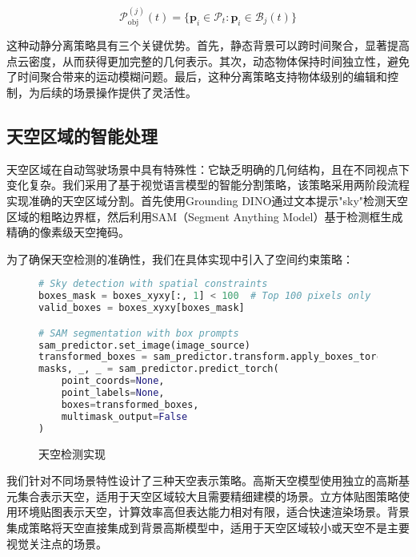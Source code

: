 \begin{equation}
\mathcal{P}_{\text{obj}}^{(j)}(t) = \{\mathbf{p}_i \in \mathcal{P}_t : \mathbf{p}_i \in \mathcal{B}_j(t)\}
\label{eq:object_points}
\end{equation}

这种动静分离策略具有三个关键优势。首先，静态背景可以跨时间聚合，显著提高点云密度，从而获得更加完整的几何表示。其次，动态物体保持时间独立性，避免了时间聚合带来的运动模糊问题。最后，这种分离策略支持物体级别的编辑和控制，为后续的场景操作提供了灵活性。

\subsection{天空区域的智能处理}

天空区域在自动驾驶场景中具有特殊性：它缺乏明确的几何结构，且在不同视点下变化复杂。我们采用了基于视觉语言模型的智能分割策略，该策略采用两阶段流程实现准确的天空区域分割。首先使用Grounding DINO通过文本提示"sky"检测天空区域的粗略边界框，然后利用SAM（Segment Anything Model）基于检测框生成精确的像素级天空掩码。

为了确保天空检测的准确性，我们在具体实现中引入了空间约束策略：

\begin{figure}[!b]
  \begin{tmpbox}
    \begin{lstlisting}[language=Python]
# Sky detection with spatial constraints
boxes_mask = boxes_xyxy[:, 1] < 100  # Top 100 pixels only
valid_boxes = boxes_xyxy[boxes_mask]

# SAM segmentation with box prompts
sam_predictor.set_image(image_source)
transformed_boxes = sam_predictor.transform.apply_boxes_torch(valid_boxes, image_source.shape[:2])
masks, _, _ = sam_predictor.predict_torch(
    point_coords=None,
    point_labels=None, 
    boxes=transformed_boxes,
    multimask_output=False
)
\end{lstlisting}
  \end{tmpbox}
  \caption{天空检测实现}
  \label{fig:sky-detection-code}
\end{figure}

我们针对不同场景特性设计了三种天空表示策略。高斯天空模型使用独立的高斯基元集合表示天空，适用于天空区域较大且需要精细建模的场景。立方体贴图策略使用环境贴图表示天空，计算效率高但表达能力相对有限，适合快速渲染场景。背景集成策略将天空直接集成到背景高斯模型中，适用于天空区域较小或天空不是主要视觉关注点的场景。

